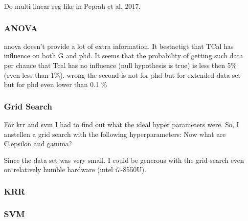 Do multi linear reg like in Peprah et al. 2017\cite{peprah2017appraisal}.

\subsubsection{ANOVA}\label{sec:res-anova}
\Gls{anova} doesn't provide a lot of extra information. 
It bestaetigt that TCal has influence on both G and phd. 
It seems that the probability of getting such data per chance that Tcal has no influence 
(null hypothesis is true) is less then 5\% (even less than 1\%). 
wrong the second is not for phd but for extended data set
but for phd even lower than 0.1 \%

\iffalse
\subsubsection{Grid Search}
For \gls{krr} and {svm} I had to find out what the ideal hyper parameters were. 
So, I anstellen a grid search with the following hyperparameters: 
Now what are C,epsilon and gamma? 

Since the data set was very small, I could be generous with the grid search even on relatively humble hardware (intel i7-8550U). 

\subsubsection{KRR}

\subsubsection{SVM}


